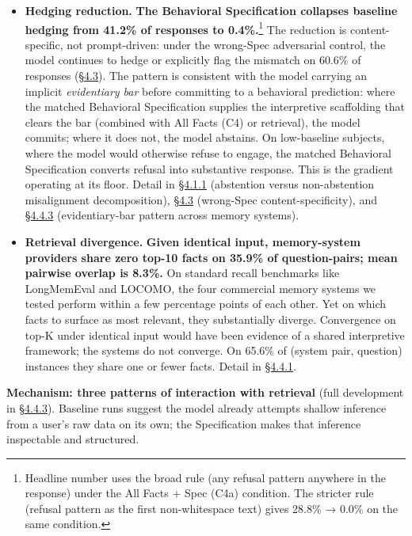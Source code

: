 \begin{itemize}
\item
  \textbf{Hedging reduction.} \textbf{The Behavioral Specification
  collapses baseline hedging from 41.2\% of responses to
  0.4\%.}\footnote{Headline number uses the broad rule (any
    refusal pattern anywhere in the response) under the All Facts + Spec
    (C4a) condition. The stricter rule (refusal pattern as the first
    non-whitespace text) gives 28.8\% → 0.0\% on the same condition.}
  The reduction is content-specific, not prompt-driven: under the
  wrong-Spec adversarial control, the model continues to hedge or
  explicitly flag the mismatch on 60.6\% of responses (\hyperref[mechanism-correct-content-not-format]{§4.3}). The
  pattern is consistent with the model carrying an implicit
  \emph{evidentiary bar} before committing to a behavioral prediction:
  where the matched Behavioral Specification supplies the interpretive
  scaffolding that clears the bar (combined with All Facts (C4) or
  retrieval), the model commits; where it does not, the model abstains.
  On low-baseline subjects, where the model would otherwise refuse to
  engage, the matched Behavioral Specification converts refusal into
  substantive response. This is the gradient operating at its floor.
  Detail in \hyperref[per-question-baseline-engagement-and-the-worked-rubric-example]{§4.1.1} (abstention versus non-abstention misalignment
  decomposition), \hyperref[mechanism-correct-content-not-format]{§4.3} (wrong-Spec content-specificity), and \hyperref[where-the-spec-helps-where-it-hurts-and-which-question-types-route-to-each]{§4.4.3}
  (evidentiary-bar pattern across memory systems).
\item
  \textbf{Retrieval divergence.} \textbf{Given identical input,
  memory-system providers share zero top-10 facts on 35.9\% of
  question-pairs; mean pairwise overlap is 8.3\%.} On standard
  recall benchmarks like LongMemEval and LOCOMO, the four commercial
  memory systems we tested perform within a few percentage points of
  each other. Yet on which facts to surface as most relevant, they
  substantially diverge. Convergence on top-K under identical input
  would have been evidence of a shared interpretive framework; the
  systems do not converge. On 65.6\% of (system pair, question)
  instances they share one or fewer facts. Detail in \hyperref[cross-system-retrieval-providers-do-not-converge]{§4.4.1}.
\end{itemize}

\textbf{Mechanism: three patterns of interaction with retrieval} (full
development in \hyperref[where-the-spec-helps-where-it-hurts-and-which-question-types-route-to-each]{§4.4.3}). Baseline runs suggest the model already attempts
shallow inference from a user's raw data on its own; the Specification
makes that inference inspectable and structured.

